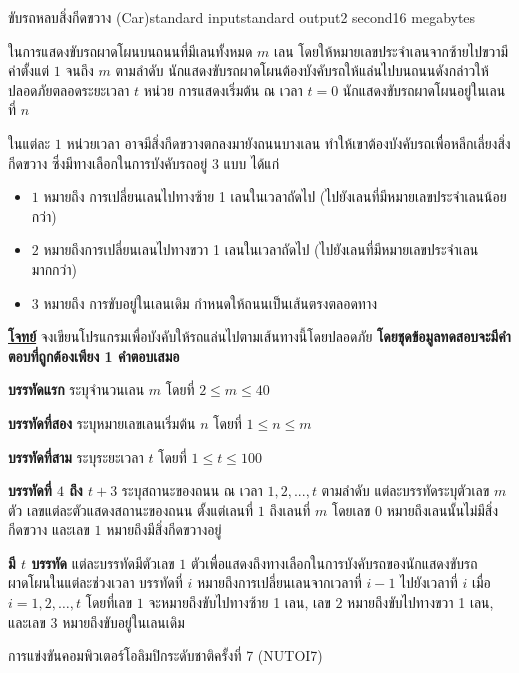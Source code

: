 \documentclass[11pt,a4paper]{article}
\begin{document}
\begin{problem}{ขับรถหลบสิ่งกีดขวาง (Car)}{standard input}{standard output}{2 second}{16 megabytes}

ในการแสดงขับรถผาดโผนบนถนนที่มีเลนทั้งหมด $m$ เลน โดยให้หมายเลขประจำเลนจากซ้ายไปขวามีค่าตั้งแต่ $1$ จนถึง $m$ ตามลำดับ นักแสดงขับรถผาดโผนต้องบังคับรถให้แล่นไปบนถนนดังกล่าวให้ปลอดภัยตลอดระยะเวลา $t$ หน่วย การแสดงเริ่มต้น ณ เวลา $t = 0$ นักแสดงขับรถผาดโผนอยู่ในเลนที่ $n$

ในแต่ละ $1$ หน่วยเวลา อาจมีสิ่งกีดขวางตกลงมายังถนนบางเลน ทำให้เขาต้องบังคับรถเพื่อหลีกเลี่ยงสิ่งกีดขวาง ซึ่งมีทางเลือกในการบังคับรถอยู่ $3$ แบบ ได้แก่ 
\begin{itemize}

\item $1$ หมายถึง การเปลี่ยนเลนไปทางซ้าย 1 เลนในเวลาถัดไป (ไปยังเลนที่มีหมายเลขประจำเลนน้อยกว่า)
\item $2$ หมายถึงการเปลี่ยนเลนไปทางขวา 1 เลนในเวลาถัดไป (ไปยังเลนที่มีหมายเลขประจำเลนมากกว่า)
\item $3$ หมายถึง การขับอยู่ในเลนเดิม กำหนดให้ถนนเป็นเส้นตรงตลอดทาง
\end{itemize}



\bigskip
\underline{\textbf{โจทย์}}  จงเขียนโปรแกรมเพื่อบังคับให้รถแล่นไปตามเส้นทางนี้โดยปลอดภัย \textbf{โดยชุดข้อมูลทดสอบจะมีคำตอบที่ถูกต้องเพียง 1 คำตอบเสมอ}


\InputFile

 \textbf{บรรทัดแรก} ระบุจำนวนเลน $m$ โดยที่ $2 \leq m \leq 40$

\textbf{บรรทัดที่สอง} ระบุหมายเลขเลนเริ่มต้น $n$ โดยที่ $1 \leq n \leq m$

\textbf{บรรทัดที่สาม} ระบุระยะเวลา $t$ โดยที่ $1 \leq t \leq 100$

\textbf{บรรทัดที่ $4$ ถึง $t + 3$} ระบุสถานะของถนน ณ เวลา $1,2,...,t$ ตามลำดับ แต่ละบรรทัดระบุตัวเลข $m$ ตัว เลขแต่ละตัวแสดงสถานะของถนน ตั้งแต่เลนที่ $1$ ถึงเลนที่ $m$ โดยเลข $0$ หมายถึงเลนนั้นไม่มีสิ่งกีดขวาง และเลข $1$ หมายถึงมีสิ่งกีดขวางอยู่



\OutputFile

\textbf{มี $t$ บรรทัด }แต่ละบรรทัดมีตัวเลข $1$ ตัวเพื่อแสดงถึงทางเลือกในการบังคับรถของนักแสดงขับรถผาดโผนในแต่ละช่วงเวลา บรรทัดที่ $i$ หมายถึงการเปลี่ยนเลนจากเวลาที่ $i −1$ ไปยังเวลาที่ $i$ เมื่อ $i =1,2,…,t$ โดยที่เลข $1$ จะหมายถึงขับไปทางซ้าย 1 เลน, เลข $2$ หมายถึงขับไปทางขวา 1 เลน, และเลข $3$ หมายถึงขับอยู่ในเลนเดิม

\Examples

\begin{example}
%
%
\end{example}


\Source

การแข่งขันคอมพิวเตอร์โอลิมปิกระดับชาติครั้งที่ 7 (NUTOI7)

\end{problem}
\end{document}
